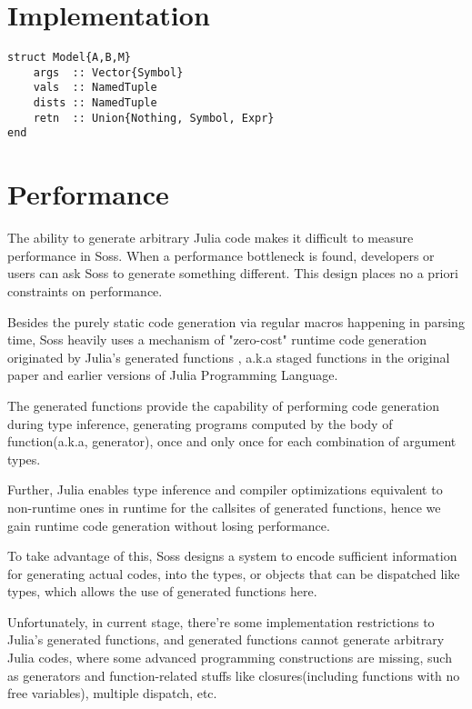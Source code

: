 \documentclass[anonymous=false, %
               format=acmsmall, %
               review=true, %
               screen=true, %
               nonacm=true]{acmart}
\begin{document}
\section{Implementation}

\begin{verbatim}
struct Model{A,B,M} 
    args  :: Vector{Symbol}
    vals  :: NamedTuple
    dists :: NamedTuple
    retn  :: Union{Nothing, Symbol, Expr}
end
\end{verbatim}


\section{Performance}



The ability to generate arbitrary  Julia code makes it difficult to measure performance in Soss. When a performance bottleneck is found, developers or users can ask Soss to generate something different. This design places no a priori constraints on performance.


Besides the purely static code generation via regular macros happening in parsing time, Soss heavily uses a mechanism of "zero-cost" runtime code generation originated by Julia's generated functions \cite{bezanson2012julia}, a.k.a staged functions in the original paper and earlier versions of Julia Programming Language.

The generated functions provide the capability of performing code generation during type inference, generating programs computed by the body of function(a.k.a, generator), once and only once for each combination of argument types.

Further, Julia enables type inference and compiler optimizations equivalent to non-runtime ones in runtime for the callsites of generated functions, hence we gain runtime code generation without losing performance.

To take advantage of this, Soss designs a system to encode sufficient information for generating actual codes, into the types, or objects that can be dispatched like types, which allows the use of generated functions here.

Unfortunately, in current stage, there're some implementation restrictions to Julia's generated functions, and generated functions cannot generate arbitrary Julia codes,
where some advanced programming constructions are missing, such as generators and function-related stuffs like closures(including functions with no free variables), multiple dispatch, etc.
\end{document}
